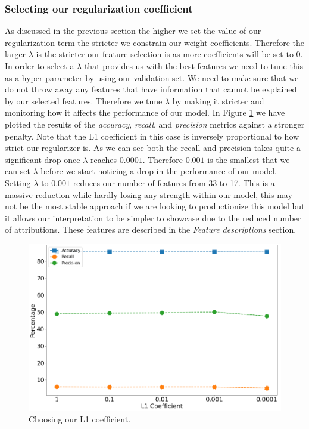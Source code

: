 \subsubsection{Selecting our regularization coefficient}
As discussed in the previous section the higher we set the value of our regularization term the stricter we constrain our weight coefficients. Therefore the larger $\lambda$ is the stricter our feature selection is as more coefficients will be set to 0. In order to select a $\lambda$ that provides us with the best features we need to tune this as a hyper parameter by using our validation set. We need to make sure that we do not throw away any features that have information that cannot be explained by our selected features. Therefore we tune $\lambda$ by making it stricter and monitoring how it affects the performance of our model. In Figure \ref{fig-regularizer} we have plotted the results of the \emph{accuracy}, \emph{recall}, and \emph{precision} metrics against a stronger penalty. Note that the L1 coefficient in this case is inversely proportional to how strict our regularizer is. As we can see both the recall and precision takes quite a significant drop once $\lambda$ reaches $0.0001$. Therefore $0.001$ is the smallest that we can set $\lambda$ before we start noticing a drop in the performance of our model. Setting $\lambda$ to $0.001$ reduces our number of features from 33 to 17. This is a massive reduction while hardly losing any strength within our model, this may not be the most stable approach if we are looking to productionize this model but it allows our interpretation to be simpler to showcase due to the reduced number of attributions. These features are described in the \emph{Feature descriptions} section.
\begin  {figure}[!htpb]
\centering
  \includegraphics[width=\linewidth]{Credit_Images/Regularizer.png}
   \caption{Choosing our L1 coefficient.}
    \label{fig-regularizer}
\end{figure}


